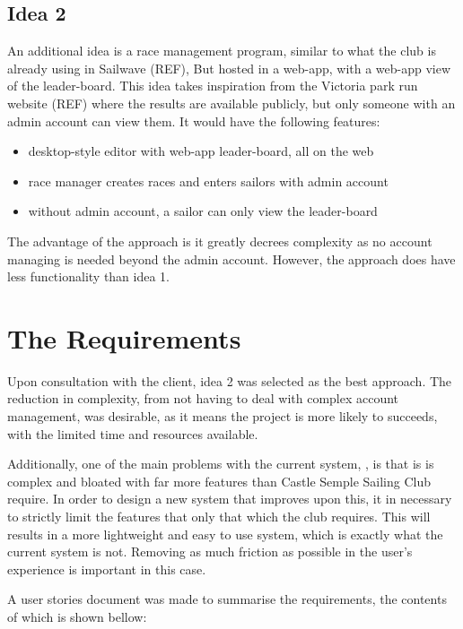 \documentclass{l4proj}
\begin{document}
\subsection{Idea 2}
An additional idea is a race management program, similar to what the club is already using in Sailwave (REF), But hosted in a web-app, with a web-app view of the leader-board. This idea takes inspiration from the Victoria park run website (REF) where the results are available publicly, but only someone with an admin account can view them. It would have the following features:
\begin{itemize}
    \item
    desktop-style editor with web-app leader-board, all on the web
    \item
    race manager creates races and enters sailors with admin account
    \item
    without admin account, a sailor can only view the leader-board
\end{itemize}

The advantage of the approach is it greatly decrees complexity as no account managing is needed beyond the admin account. However, the approach does have less functionality than idea 1.

\section{The Requirements}
Upon consultation with the client, idea 2 was selected as the best approach. The reduction in complexity, from not having to deal with complex account management, was desirable, as it means the project is more likely to succeeds, with the limited time and
resources available.

Additionally, one of the main problems with the current system, \citep{sailwave}, is that is is complex and bloated with far more features than Castle Semple Sailing Club require. In order to design a new system that improves upon this, it in necessary to strictly limit the features that only that which the club requires. This will results in a more lightweight and easy to use system, which is exactly what the current system is not. Removing as much friction as possible in the user's experience is important in this case.

A user stories document was made to summarise the requirements, the contents of which is shown bellow:
\end{document}
